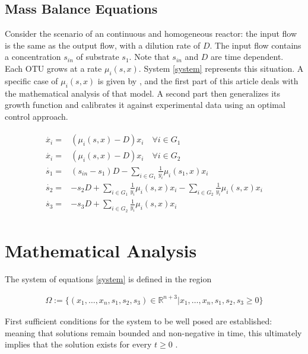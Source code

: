 \documentclass[3p,times]{elsarticle}
\newcommand{\R}{\mathbb{R}}
\begin{document}
\subsection{Mass Balance Equations}

Consider the scenario of an continuous and homogeneous reactor: the input flow is the same as the output flow, with a dilution rate of $D$. The input flow contains a concentration $s_{in}$ of substrate $s_1$. Note that $s_{in}$ and $D$ are time dependent. Each OTU grows at a rate $\mu_i(s,x)$. System \eqref{system} represents this situation. A specific case of $\mu_i(s,x)$ is given by \cite{Dumont2016}, and the first part of this article deals with the mathematical analysis of that model. A second part then generalizes its growth function and calibrates it against experimental data using an optimal control approach.

\begin{align} 
\label{system}
\begin{array}{cl}
\dot{x_i} =& \left(\mu_i(s,x) -D \right)x_i \quad \forall i \in G_1\\
\dot{x_i} =& \left(\mu_i(s,x) -D \right)x_i \quad \forall i \in G_2 \\
\dot{s_1} =& \displaystyle (s_{in}-s_1)D-\sum\limits_{i\in G_1} \frac{1}{y_i}\mu_i(s_1,x) x_i  \\
\dot{s_2} = & \displaystyle -s_2D+\sum\limits_{i\in G_1}\frac{1}{y_i}\mu_i(s,x)x_i 		-\sum\limits_{i\in G_2}\frac{1}{y_i}\mu_i(s,x) x_i  \\
\dot{s_3} =&  \displaystyle -s_3D+\sum\limits_{i\in G_2}\frac{1}{y_i}\mu_i(s,x) x_i 
\end{array}
\end{align}	


\section{Mathematical Analysis}

The system of equations \eqref{system} is defined in the region 

\begin{align*}
\Omega := \{ (x_1,\dots,x_n,s_1,s_2,s_3)\in  \R^{n+3} | x_1,\dots,x_n,s_1,s_2,s_3  \geq 0  \}
\end{align*}

First sufficient conditions for the system to be well posed are established: meaning that solutions remain bounded and non-negative in time, this ultimately implies that the solution exists for every $t \geq 0$ \cite{Khalil1996}. 
\end{document}
